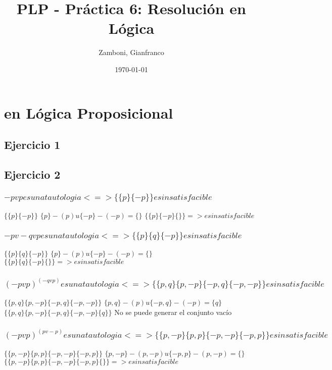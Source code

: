 \documentclass[10pt,a4paper]{article}
\begin{document}
  \title{PLP - Práctica 6: Resolución en Lógica}

  \date{\today}

  \author{Zamboni, Gianfranco}

  \maketitle
  \setcounter{page}{1}

  \section*{ en Lógica Proposicional}
  \subsection{Ejercicio 1}
  \subsection{Ejercicio 2}
    \subsubsection{$-p v p es una tautologia  <=> \{\{p\} \{-p\}\} es insatisfacible$}
    $\{\{p\} \{-p\}\}$
    $\{p\}-(p)u\{-p\}-(-p)=\{\}$
    $\{\{p\} \{-p\} \{\}\} => es insatisfacible$

    \subsubsection{$-p v -q v p es una tautologia <=> \{\{p\} \{q\} \{-p\}\} es insatisfacible$}
    $\{\{p\} \{q\} \{-p\}\}$
    $\{p\}-(p)u\{-p\}-(-p)=\{\}$
    $\{\{p\} \{q\} \{-p\} \{\}\} => es insatisfacible$

    \subsubsection{$(-p v p)^(-q v p) es una tautologia <=> \{\{p, q\} \{p, -p\} \{-p, q\} \{-p, -p\}\} es insatisfacible$}
    $\{\{p, q\} \{p, -p\} \{-p, q\} \{-p, -p\}\}$
    $\{p, q\}-(p)u\{-p, q\}-(-p)=\{q\}$
    $\{\{p, q\} \{p, -p\} \{-p, q\} \{-p, -p\} \{q\}\}$
    No se puede generar el conjunto vacío

    \subsubsection{$(-p v p)^(p v -p) es una tautologia <=> \{\{p, -p\} \{p, p\} \{-p, -p\} \{-p, p\}\} es insatisfacible$}
    $\{\{p, -p\} \{p, p\} \{-p, -p\} \{-p, p\}\}$
    $\{p, -p\}-(p,-p)u\{-p, p\}-(p,-p)=\{\}$
    $\{\{p, -p\} \{p, p\} \{-p, -p\} \{-p, p\} \{\}\} => es insatisfacible$
\end{document}

